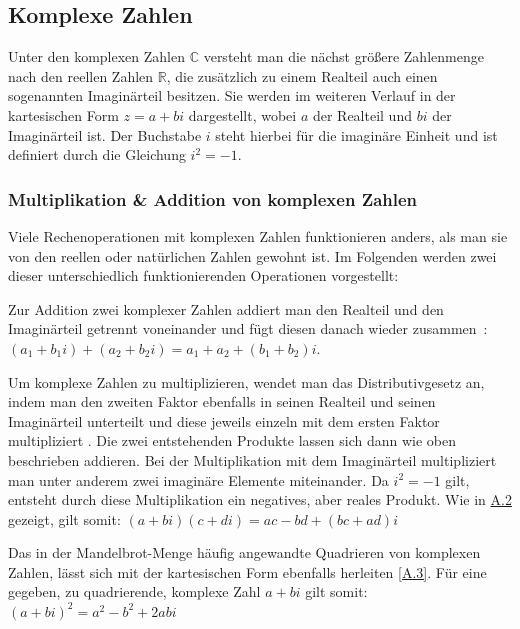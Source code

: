 \subsection{Komplexe Zahlen}\label{subsec:complex-numbers}

Unter den komplexen Zahlen $\mathbb{C}$ versteht man die nächst größere Zahlenmenge
nach den reellen Zahlen $\mathbb{R}$,
die zus\"atzlich zu einem Realteil auch einen sogenannten Imagin\"arteil besitzen.
Sie werden im weiteren Verlauf in der kartesischen Form
$z = a + bi$ dargestellt, wobei $a$ der Realteil und $bi$ der Imagin\"arteil ist.
Der Buchstabe $i$ steht hierbei für die imaginäre Einheit und
ist definiert durch die Gleichung $i^2 = -1$.

\subsubsection{Multiplikation \& Addition von komplexen Zahlen}
\label{subsubsec:addition-and-multiplication-of-complex-numbers}

Viele Rechenoperationen mit komplexen Zahlen funktionieren anders, als man sie
von den reellen oder natürlichen Zahlen gewohnt ist.
Im Folgenden werden zwei dieser unterschiedlich funktionierenden
Operationen vorgestellt:

Zur Addition zwei komplexer Zahlen addiert man den
Realteil und den Imagin\"arteil getrennt voneinander und fügt diesen
danach wieder zusammen~\cite[S. 2]{lichtenegger_komplexe_2002}:
$(a_1 + {b_1}i) + (a_2 + {b_2}i) = a_1 + a_2 + (b_1 + b_2)i$.

Um komplexe Zahlen zu multiplizieren, wendet man das Distributivgesetz an,
indem man den zweiten Faktor ebenfalls in seinen Realteil und seinen
Imagin\"arteil unterteilt und diese jeweils einzeln mit dem ersten Faktor multipliziert
\cite[S. 2f.]{lichtenegger_komplexe_2002}.
Die zwei entstehenden Produkte lassen sich dann wie oben beschrieben addieren.
Bei der Multiplikation mit dem Imagin\"arteil multipliziert man unter anderem
zwei imagin\"are Elemente miteinander.
Da $i^2 = -1$ gilt, entsteht durch diese Multiplikation
ein negatives, aber reales Produkt.
Wie in \hyperref[app:2]{A.2} gezeigt, gilt somit:
$ (a + bi)(c + di) = ac - bd + (bc + ad)i $

Das in der Mandelbrot-Menge häufig angewandte Quadrieren von komplexen Zahlen,
lässt sich mit der kartesischen Form ebenfalls herleiten \hyperref[app:3]{[A.3]}.
Für eine gegeben, zu quadrierende, komplexe Zahl $a + bi$ gilt somit:
$(a + bi)^2 = a^2 - b^2 + 2abi$



